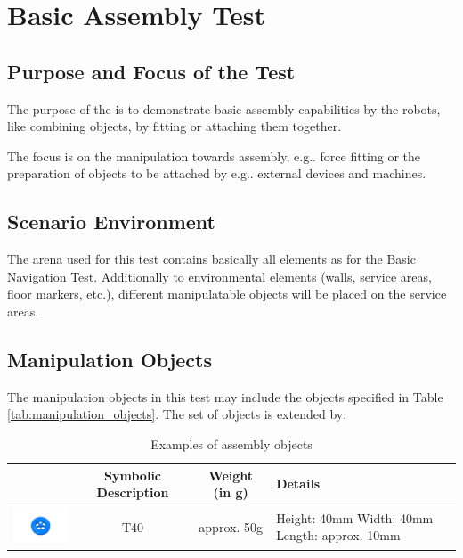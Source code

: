 \newpage
\section{Basic Assembly Test}

\subsection{Purpose and Focus of the Test}
The purpose of the  is to demonstrate basic assembly capabilities by the robots, like combining objects, by fitting or attaching them together.
\par
The focus is on the manipulation towards assembly, e.g.. force fitting or the preparation of objects to be attached by e.g.. external devices and machines.

\subsection{Scenario Environment}
The arena used for this test contains basically all elements as for the Basic Navigation Test. Additionally to environmental elements (walls, service areas, floor markers, etc.), different manipulatable objects will be placed on the service areas. 

\subsection{Manipulation Objects}
The manipulation objects in this test may include the objects specified in Table \ref{tab:manipulation_objects}. The set of objects is extended by:

\begin{table}[p]
\begin{tabular}{|c|c|c|p{5cm}|}
\hline 
 & Symbolic Description & Weight (in g) & Details \\ 
\hline 
\includegraphics[width=3cm]{../images/BAT_Tire.png}  & T40 & approx. 50g & Height: 40mm \newline
 Width: 40mm \newline
 Length: approx. 10mm \\ 
\hline 
\end{tabular} 

\label{tab:bat_objects}
\caption{Examples of assembly objects}
\end{table}

